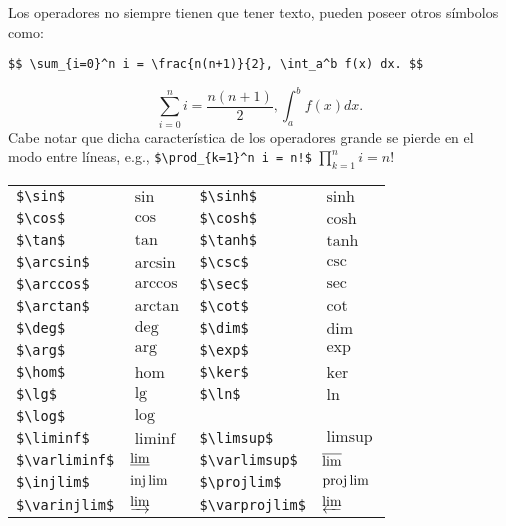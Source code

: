 \documentclass[intro-breve-latex.tex]{subfiles}
\begin{document}
Los operadores no siempre tienen que tener texto, pueden poseer otros símbolos como:
\begin{lstlisting}[basicstyle=\footnotesize\ttfamily]
$$ \sum_{i=0}^n i = \frac{n(n+1)}{2}, \int_a^b f(x) dx. $$
\end{lstlisting}
$$ \sum_{i=0}^n i = \frac{n(n+1)}{2}, \int_a^b f(x) dx. $$
Cabe notar que dicha característica de los operadores grande se pierde en el modo entre líneas, e.g.,
\lstinline|$\prod_{k=1}^n i = n!$| $\prod_{k=1}^n i = n!$
\begin{longtable}{llll}
	\hline \hline
	\endhead
	\hline \hline
	\endfoot

	\lstinline|$\sin$|    & $\sin$    & \lstinline|$\sinh$|   & $\sinh$ \\
	\lstinline|$\cos$|    & $\cos$    & \lstinline|$\cosh$|   & $\cosh$ \\
	\lstinline|$\tan$|    & $\tan$    & \lstinline|$\tanh$|   & $\tanh$ \\
	\lstinline|$\arcsin$| & $\arcsin$ & \lstinline|$\csc$|    & $\csc$  \\
	\lstinline|$\arccos$| & $\arccos$ & \lstinline|$\sec$|    & $\sec$  \\
	\lstinline|$\arctan$| & $\arctan$ & \lstinline|$\cot$|    & $\cot$  \\

	\lstinline|$\deg$|    & $\deg$    & \lstinline|$\dim$|    & $\dim$ \\
	\lstinline|$\arg$|    & $\arg$    & \lstinline|$\exp$|    & $\exp$ \\
	\lstinline|$\hom$|    & $\hom$    & \lstinline|$\ker$|    & $\ker$ \\
	\lstinline|$\lg$|     & $\lg$     & \lstinline|$\ln$|     & $\ln$ \\
	\lstinline|$\log$|    & $\log$    &  \\
	\hline
	\lstinline|$\liminf$|    & $\liminf$    & \lstinline|$\limsup$|     & $\limsup$ \\
	\lstinline|$\varliminf$| & $\varliminf$ & \lstinline|$\varlimsup$|  & $\varlimsup$ \\
	\lstinline|$\injlim$|    & $\injlim$    & \lstinline|$\projlim$|    & $\projlim$ \\
	\lstinline|$\varinjlim$| & $\varinjlim$ & \lstinline|$\varprojlim$| & $\varprojlim$ \\


\end{longtable}
\end{document}
